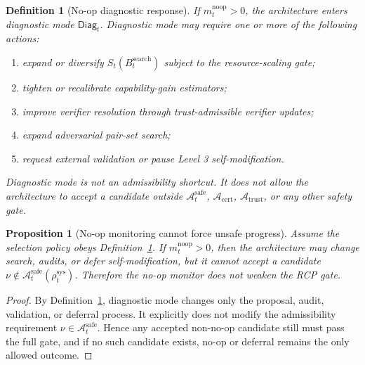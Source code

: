 \documentclass[11pt,a4paper]{article}
\newtheorem{proposition}[theorem]{Proposition}
\newtheorem{definition}[theorem]{Definition}
\newcommand{\Acal}{\mathcal A}
\newcommand{\sys}{\mathrm{sys}}
\newcommand{\safe}{\mathrm{safe}}
\newcommand{\search}{\mathrm{search}}
\newcommand{\cert}{\mathrm{cert}}
\newcommand{\trust}{\mathrm{trust}}
\newcommand{\noop}{\mathrm{noop}}
\begin{document}
\begin{definition}[No-op diagnostic response]
\label{def:no-op-diagnostic-response}
If \(m_t^{\noop}>0\), the architecture enters diagnostic mode \(\mathsf{Diag}_t\). Diagnostic mode may require one or more of the following actions:
\begin{enumerate}[label=(\roman*),leftmargin=1.5em]
    \item expand or diversify \(S_t(B_t^{\search})\) subject to the resource-scaling gate;
    \item tighten or recalibrate capability-gain estimators;
    \item improve verifier resolution through trust-admissible verifier updates;
    \item expand adversarial pair-set search;
    \item request external validation or pause Level 3 self-modification.
\end{enumerate}
Diagnostic mode is not an admissibility shortcut. It does not allow the architecture to accept a candidate outside \(\Acal_t^{\safe}\), \(\Acal_{\cert}\), \(\Acal_{\trust}\), or any other safety gate.
\end{definition}

\begin{proposition}[No-op monitoring cannot force unsafe progress]
\label{prop:noop-monitor-nonrelaxation}
Assume the selection policy obeys Definition~\ref{def:no-op-diagnostic-response}. If \(m_t^{\noop}>0\), then the architecture may change search, audits, or defer self-modification, but it cannot accept a candidate \(\nu\notin\Acal_t^{\safe}(\rho_t^{\sys})\). Therefore the no-op monitor does not weaken the RCP gate.
\end{proposition}

\begin{proof}
By Definition~\ref{def:no-op-diagnostic-response}, diagnostic mode changes only the proposal, audit, validation, or deferral process. It explicitly does not modify the admissibility requirement \(\nu\in\Acal_t^{\safe}\). Hence any accepted non-no-op candidate still must pass the full gate, and if no such candidate exists, no-op or deferral remains the only allowed outcome.
\end{proof}
\end{document}
